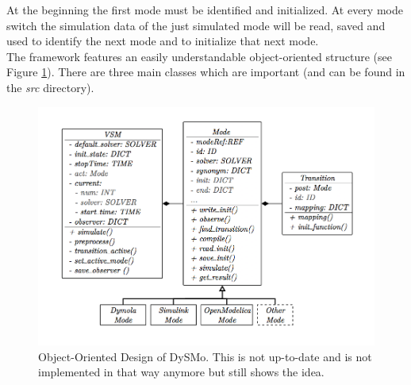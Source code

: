 At the beginning the first mode must be identified and initialized. At every mode switch the simulation data of the just simulated mode will be read, saved and used to identify the next mode and to initialize that next mode. \\

The framework features an easily understandable object-oriented structure (see Figure \ref{fig:design}). There are three main classes which are important (and can be found in the \textit{src} directory).

 \begin{figure}[htb]
 \centering
 \includegraphics[width=1.0\textwidth,angle=0]{images/GettingStarted/FrameworkDesign}
 \caption[Object-Oriented Design of DySMo]{Object-Oriented Design of DySMo. This is not up-to-date and is not implemented in that way anymore but still shows the idea.}
 \label{fig:design}
\end{figure}

